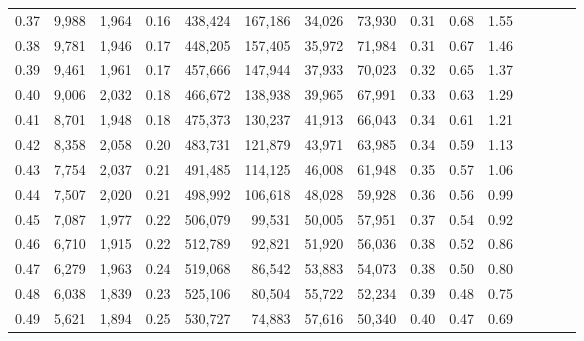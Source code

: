\begin{tabular}{rrrcrrrrrrrrrrr}
0.37 &   9,988 &  1,964 &                                       0.16 &  438,424 &  167,186 &   34,026 &   73,930 &  0.31 &  0.68 &                         1.55 \\
0.38 &   9,781 &  1,946 &                                       0.17 &  448,205 &  157,405 &   35,972 &   71,984 &  0.31 &  0.67 &                         1.46 \\
0.39 &   9,461 &  1,961 &                                       0.17 &  457,666 &  147,944 &   37,933 &   70,023 &  0.32 &  0.65 &                         1.37 \\
0.40 &   9,006 &  2,032 &                                       0.18 &  466,672 &  138,938 &   39,965 &   67,991 &  0.33 &  0.63 &                         1.29 \\
0.41 &   8,701 &  1,948 &                                       0.18 &  475,373 &  130,237 &   41,913 &   66,043 &  0.34 &  0.61 &                         1.21 \\
0.42 &   8,358 &  2,058 &                                       0.20 &  483,731 &  121,879 &   43,971 &   63,985 &  0.34 &  0.59 &                         1.13 \\
0.43 &   7,754 &  2,037 &                                       0.21 &  491,485 &  114,125 &   46,008 &   61,948 &  0.35 &  0.57 &                         1.06 \\
0.44 &   7,507 &  2,020 &                                       0.21 &  498,992 &  106,618 &   48,028 &   59,928 &  0.36 &  0.56 &                         0.99 \\
0.45 &   7,087 &  1,977 &                                       0.22 &  506,079 &   99,531 &   50,005 &   57,951 &  0.37 &  0.54 &                         0.92 \\
0.46 &   6,710 &  1,915 &                                       0.22 &  512,789 &   92,821 &   51,920 &   56,036 &  0.38 &  0.52 &                         0.86 \\
0.47 &   6,279 &  1,963 &                                       0.24 &  519,068 &   86,542 &   53,883 &   54,073 &  0.38 &  0.50 &                         0.80 \\
0.48 &   6,038 &  1,839 &                                       0.23 &  525,106 &   80,504 &   55,722 &   52,234 &  0.39 &  0.48 &                         0.75 \\
0.49 &   5,621 &  1,894 &                                       0.25 &  530,727 &   74,883 &   57,616 &   50,340 &  0.40 &  0.47 &                         0.69 \\

\end{tabular}
